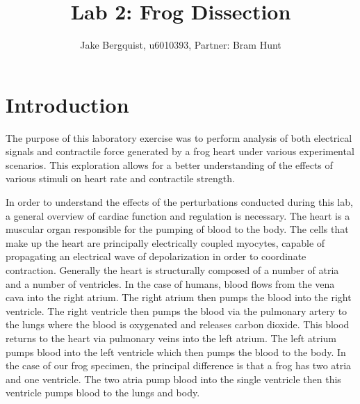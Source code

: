 \documentclass[12pt]{article}
\begin{document}
\title{Lab 2: Frog Dissection}
\author{Jake Bergquist, u6010393, Partner: Bram Hunt}
\maketitle

\section{Introduction}
\par{}
The purpose of this laboratory exercise was to perform analysis of both electrical signals and contractile force generated by a frog heart under various experimental scenarios. This exploration allows for a better understanding of the effects of various stimuli on heart rate and contractile strength.

\par{}
In order to understand the effects of the perturbations conducted during this lab, a general overview of cardiac function and regulation is necessary. The heart is a muscular organ responsible for the pumping of blood to the body. The cells that make up the heart are principally electrically coupled myocytes, capable of propagating an electrical wave of depolarization in order to coordinate contraction. Generally the heart is structurally composed of a number of atria and a number of ventricles. In the case of humans, blood flows from the vena cava into the right atrium. The right atrium then pumps the blood into the right ventricle. The right ventricle then pumps the blood via the pulmonary artery to the lungs where the blood is oxygenated and releases carbon dioxide. This blood returns to the heart via pulmonary veins into the left atrium. The left atrium pumps blood into the left ventricle which then pumps the blood to the body. In the case of our frog specimen, the principal difference is that a frog has two atria and one ventricle. The two atria pump blood into the single ventricle then this ventricle pumps blood to the lungs and body.\cite{Gavaghan2006}
\end{document}
